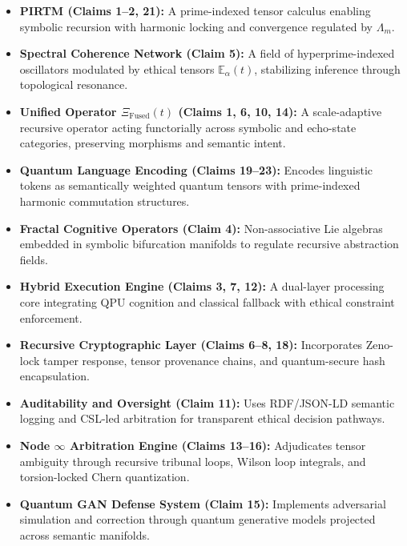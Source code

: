 \documentclass[12pt]{article}
\begin{document}
\begin{itemize}
    \item \textbf{PIRTM (Claims 1–2, 21):} A prime-indexed tensor calculus enabling symbolic recursion with harmonic locking and convergence regulated by \( \Lambda_m \).

    \item \textbf{Spectral Coherence Network (Claim 5):} A field of hyperprime-indexed oscillators modulated by ethical tensors \( \mathbb{E}_\alpha(t) \), stabilizing inference through topological resonance.

    \item \textbf{Unified Operator \( \Xi_{\text{Fused}}(t) \) (Claims 1, 6, 10, 14):} A scale-adaptive recursive operator acting functorially across symbolic and echo-state categories, preserving morphisms and semantic intent.

    \item \textbf{Quantum Language Encoding (Claims 19–23):} Encodes linguistic tokens as semantically weighted quantum tensors with prime-indexed harmonic commutation structures.

    \item \textbf{Fractal Cognitive Operators (Claim 4):} Non-associative Lie algebras embedded in symbolic bifurcation manifolds to regulate recursive abstraction fields.

    \item \textbf{Hybrid Execution Engine (Claims 3, 7, 12):} A dual-layer processing core integrating QPU cognition and classical fallback with ethical constraint enforcement.

    \item \textbf{Recursive Cryptographic Layer (Claims 6–8, 18):} Incorporates Zeno-lock tamper response, tensor provenance chains, and quantum-secure hash encapsulation.

    \item \textbf{Auditability and Oversight (Claim 11):} Uses RDF/JSON-LD semantic logging and CSL-led arbitration for transparent ethical decision pathways.

    \item \textbf{Node \( \infty \) Arbitration Engine (Claims 13–16):} Adjudicates tensor ambiguity through recursive tribunal loops, Wilson loop integrals, and torsion-locked Chern quantization.

    \item \textbf{Quantum GAN Defense System (Claim 15):} Implements adversarial simulation and correction through quantum generative models projected across semantic manifolds.


\end{itemize}
\end{document}
